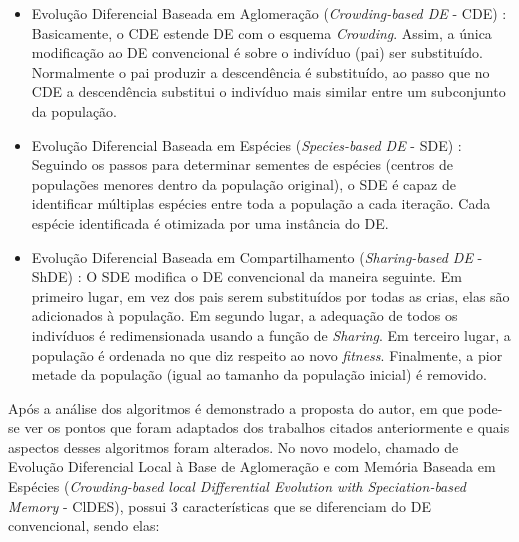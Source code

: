 \begin{itemize}
\item Evolução Diferencial Baseada em Aglomeração (\textit{Crowding-based DE} - CDE) \cite{thomsen2004multimodal}: Basicamente, o CDE estende DE com o esquema \textit{Crowding}. Assim, a única modificação ao DE convencional é sobre o indivíduo (pai) ser substituído. Normalmente o pai produzir a descendência é substituído, ao passo que no CDE a descendência substitui o indivíduo mais similar entre um subconjunto da população.

\item Evolução Diferencial Baseada em Espécies (\textit{Species-based DE} - SDE) \cite{li2005efficient}: Seguindo os passos para determinar sementes de espécies (centros de populações menores dentro da população original), o SDE é capaz de identificar múltiplas espécies entre toda a população a cada iteração. Cada espécie identificada é otimizada por uma instância do DE.

\item Evolução Diferencial Baseada em Compartilhamento (\textit{Sharing-based DE} - ShDE) \cite{thomsen2004multimodal}: O SDE modifica o DE convencional da maneira seguinte. Em primeiro lugar, em vez dos pais serem substituídos por todas as crias, elas são adicionados à população. Em segundo lugar, a adequação de todos os indivíduos é redimensionada usando a função de \textit{Sharing}. Em terceiro lugar, a população é ordenada no que diz respeito ao novo \textit{fitness}. Finalmente, a pior metade da população (igual ao tamanho da população inicial) é removido.
\end{itemize}

Após a análise dos algoritmos é demonstrado a proposta do autor, em que pode-se ver os pontos que foram adaptados dos trabalhos citados anteriormente e quais aspectos desses algoritmos foram alterados. No novo modelo, chamado de Evolução Diferencial Local à Base de Aglomeração e com Memória Baseada em Espécies (\textit{Crowding-based local Differential Evolution with Speciation-based Memory} - ClDES), possui 3 características que se diferenciam do DE convencional, sendo elas:

